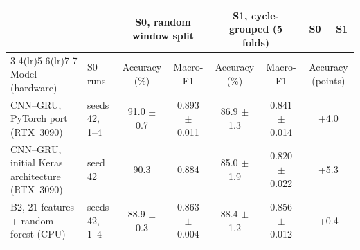 \begin{tabular}{@{}llccccc@{}}
\toprule
 & & \multicolumn{2}{c}{S0, random window split} & \multicolumn{2}{c}{S1, cycle-grouped (5 folds)} & S0 $-$ S1 \\
\cmidrule(lr){3-4}\cmidrule(lr){5-6}\cmidrule(lr){7-7}
Model (hardware) & S0 runs & Accuracy (\%) & Macro-F1 & Accuracy (\%) & Macro-F1 & Accuracy (points) \\
\midrule
CNN--GRU, PyTorch port (RTX~3090) & seeds 42, 1--4 & 91.0 $\pm$ 0.7 & 0.893 $\pm$ 0.011 & 86.9 $\pm$ 1.3 & 0.841 $\pm$ 0.014 & +4.0 \\ %
CNN--GRU, initial Keras architecture (RTX~3090) & seed 42 & 90.3 & 0.884 & 85.0 $\pm$ 1.9 & 0.820 $\pm$ 0.022 & +5.3 \\ %
B2, 21 features + random forest (CPU) & seeds 42, 1--4 & 88.9 $\pm$ 0.3 & 0.863 $\pm$ 0.004 & 88.4 $\pm$ 1.2 & 0.856 $\pm$ 0.012 & +0.4 \\ %
\bottomrule
\end{tabular}
